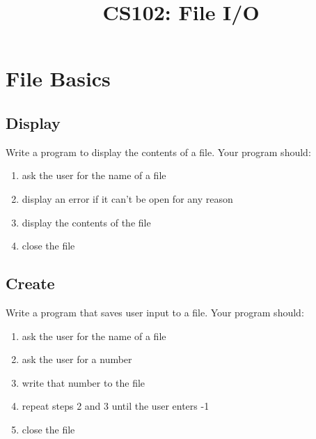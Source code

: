 \documentclass{article}
\begin{document}
\title{CS102: File I/O}

\maketitle

\section{File Basics}
\subsection{Display}
Write a program to display the contents of a file. Your program should:
\begin{enumerate}
	\item ask the user for the name of a file
	\item display an error if it can't be open for any reason
	\item display the contents of the file
	\item close the file
\end{enumerate}

\subsection{Create}
Write a program that saves user input to a file. Your program should:
\begin{enumerate}
	\item ask the user for the name of a file
	\item ask the user for a number
	\item write that number to the file
	\item repeat steps 2 and 3 until the user enters -1
	\item close the file
\end{enumerate}
\end{document}
